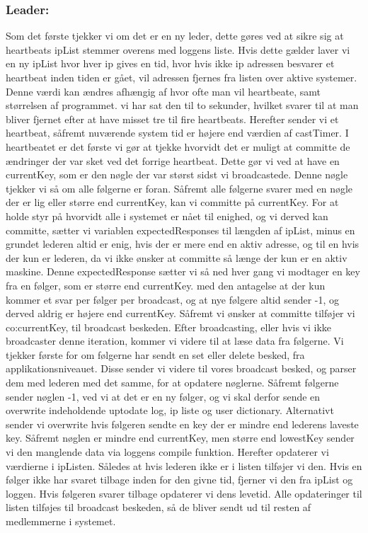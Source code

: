 \documentclass[a4paper,12pt]{article}
\begin{document}
\subsubsection{Leader:}
Som det første tjekker vi om det er en ny leder, dette gøres ved at sikre sig at heartbeats ipList stemmer overens med loggens liste. Hvis dette gælder laver vi en ny ipList hvor hver ip gives en tid, hvor hvis ikke ip adressen besvarer et heartbeat inden tiden er gået, vil adressen fjernes fra listen over aktive systemer. Denne værdi kan ændres afhængig af hvor ofte man vil heartbeate, samt størrelsen af programmet. vi har sat den til to sekunder, hvilket svarer til at man bliver fjernet efter at have misset tre til fire heartbeats. 
Herefter sender vi et heartbeat, såfremt nuværende system tid er højere end værdien af castTimer. I heartbeatet er det første vi gør at tjekke hvorvidt det er muligt at committe de ændringer der var sket ved det forrige heartbeat. Dette gør vi ved at have en currentKey, som er den nøgle der var størst sidst vi broadcastede. Denne nøgle tjekker vi så om alle følgerne er foran. Såfremt alle følgerne svarer med en nøgle der er lig eller større end currentKey, kan vi committe på currentKey.
For at holde styr på hvorvidt alle i systemet er nået til enighed, og vi derved kan committe, sætter vi variablen expectedResponses til længden af ipList, minus en grundet lederen altid er enig, hvis der er mere end en aktiv adresse, og til en  hvis der kun er lederen, da vi ikke ønsker at committe så længe der kun er en aktiv maskine.
Denne expectedResponse sætter vi så ned hver gang vi modtager en key fra en følger, som er større end currentKey. med den antagelse at der kun kommer et svar per følger per broadcast, og at nye følgere altid sender -1, og derved aldrig er højere end currentKey.
Såfremt vi ønsker at committe tilføjer vi co:currentKey, til broadcast beskeden.
Efter broadcasting, eller hvis vi ikke broadcaster denne iteration, kommer vi videre til at læse data fra følgerne. Vi tjekker første for om følgerne har sendt en set eller delete besked, fra applikationsniveauet. Disse sender vi videre til vores broadcast besked, og parser dem med lederen med det samme, for at opdatere nøglerne.
Såfremt følgerne sender nøglen -1, ved vi at det er en ny følger, og vi skal derfor sende en overwrite indeholdende uptodate log, ip liste og user dictionary. Alternativt sender vi overwrite hvis følgeren sendte en key der er mindre end lederens laveste key.
Såfremt nøglen er mindre end currentKey, men større end lowestKey sender vi den manglende data via loggens compile funktion.
Herefter opdaterer vi værdierne i ipListen. Således at hvis lederen ikke er i listen tilføjer vi den. Hvis en følger ikke har svaret tilbage inden for den givne tid, fjerner vi den fra ipList og loggen. Hvis følgeren svarer tilbage opdaterer vi dens levetid. 
Alle opdateringer til listen tilføjes til broadcast beskeden, så de bliver sendt ud til resten af medlemmerne i systemet.
\end{document}
